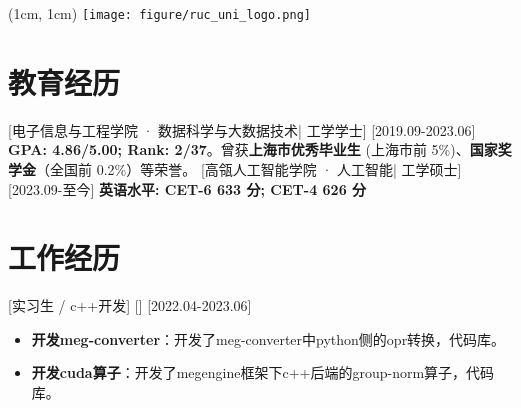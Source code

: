 \documentclass{resume}
\begin{document}
\begin{textblock*}{2cm}(1cm, 1cm)
  {\texttt{[image: figure/ruc\_uni\_logo.png]}}
\end{textblock*}


\ResumeTitle


\section{教育经历}
[\textnormal{电子信息与工程学院 · 数据科学与大数据技术|} 工学学士]
[2019.09-2023.06]
\textbf{GPA: 4.86/5.00; Rank: 2/37}。曾获\textbf{上海市优秀毕业生} (上海市前 5\%)、\textbf{国家奖学金}（全国前 0.2\%）等荣誉。
[\textnormal{高瓴人工智能学院 · 人工智能|} 工学硕士]
[2023.09-至今]
\textbf{英语水平: CET-6 633 分; CET-4 626 分}

\section{工作经历}

[实习生 / c++开发]
[]
[2022.04-2023.06]
\begin{itemize}
  \item \textbf{开发meg-converter}：开发了meg-converter中python侧的opr转换，代码库。
  \item \textbf{开发cuda算子}：开发了megengine框架下c++后端的group-norm算子，代码库。
\end{itemize}
\end{document}
